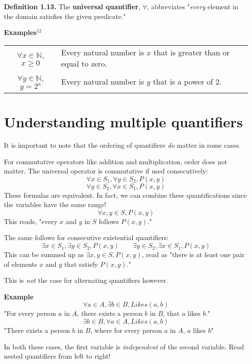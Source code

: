 \documentclass{article}
\begin{document}
\textbf{Definition 1.13.} The \textbf{universal quantifier}, $\forall$,
abbreviates "\emph{every} element in the domain satisfies the given predicate."

\textbf{Examples$^{12}$}
\begin{center}
\begin{tabular}{|c p{7.54cm}|}
    $\forall x \in \mathbb{N}$, $x \geq 0$ & Every natural number is
    $x$ that is greater than or equal to zero. \\
    $\forall y \in \mathbb{N}$, $y = 2^a$  & Every natural number is  
    $y$ that is a power of 2.
\end{tabular}
\end{center}

\section{Understanding multiple quantifiers}
It is important to note that the ordering of quantifiers \emph{do} matter in
some cases.

For commutative operators like addition and multiplication, order does not
matter. The universal operator is commutative if used consecutively:
$$\forall x \in S_1, \forall y \in S_2, P(x, y)$$
$$\forall y \in S_2, \forall x \in S_1, P(x, y)$$
These formulas are equivalent. In fact, we can combine these quantifications
since the variables have the same range!
$$\forall x, y \in S, P(x, y)$$
This reads, "every $x$ and $y$ in $S$ follows $P(x, y)$."

\newpage
The same follows for consecutive existential quantifiers:
$$\exists x \in S_1, \exists y \in S_2, P(x, y) \quad \quad 
\exists y \in S_2, \exists x \in S_1, P(x, y)$$
This can be summed up as $\exists x, y \in S, P(x, y)$, read as 
"there is at least one pair of elements $x$ and $y$ that satisfy $P(x,y)$."

This is \emph{not} the case for alternating quantifiers however.

\textbf{Example}
$$\forall a \in A, \exists b \in B, Likes(a, b)$$
"For every person $a$ in $A$, there exists a person $b$ in $B$, that $a$ likes $b$."
$$\exists b \in B, \forall a \in A, Likes(a, b)$$
"There exists a person $b$ in $B$, where for every person $a$ in $A$, $a$ likes $b$"

In both these cases, the first variable is \emph{independent} of the
second variable. Read nested quantifiers from left to right!
\end{document}
